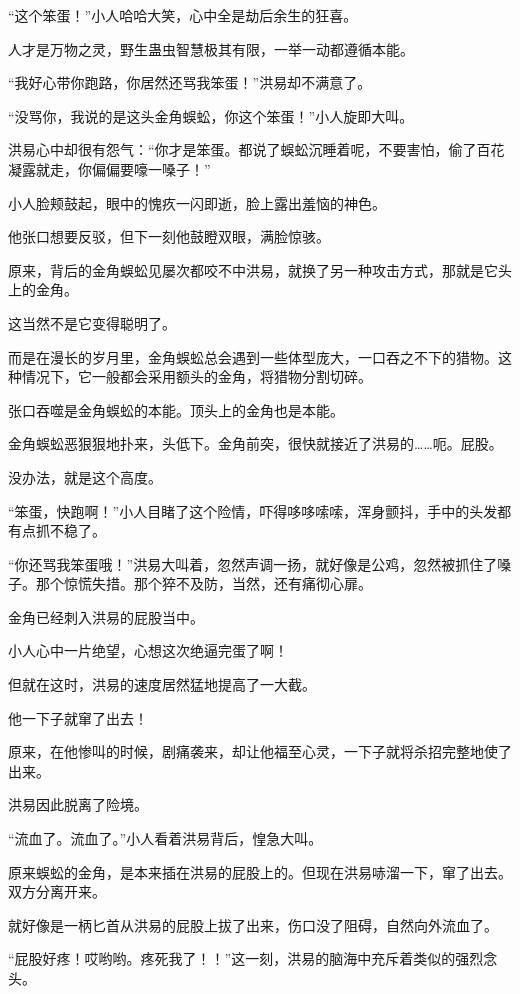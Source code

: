\begin{this_body}
“这个笨蛋！”小人哈哈大笑，心中全是劫后余生的狂喜。

人才是万物之灵，野生蛊虫智慧极其有限，一举一动都遵循本能。

“我好心带你跑路，你居然还骂我笨蛋！”洪易却不满意了。

“没骂你，我说的是这头金角蜈蚣，你这个笨蛋！”小人旋即大叫。

洪易心中却很有怨气：“你才是笨蛋。都说了蜈蚣沉睡着呢，不要害怕，偷了百花凝露就走，你偏偏要嚎一嗓子！”

小人脸颊鼓起，眼中的愧疚一闪即逝，脸上露出羞恼的神色。

他张口想要反驳，但下一刻他鼓瞪双眼，满脸惊骇。

原来，背后的金角蜈蚣见屡次都咬不中洪易，就换了另一种攻击方式，那就是它头上的金角。

这当然不是它变得聪明了。

而是在漫长的岁月里，金角蜈蚣总会遇到一些体型庞大，一口吞之不下的猎物。这种情况下，它一般都会采用额头的金角，将猎物分割切碎。

张口吞噬是金角蜈蚣的本能。顶头上的金角也是本能。

金角蜈蚣恶狠狠地扑来，头低下。金角前突，很快就接近了洪易的……呃。屁股。

没办法，就是这个高度。

“笨蛋，快跑啊！”小人目睹了这个险情，吓得哆哆嗦嗦，浑身颤抖，手中的头发都有点抓不稳了。

“你还骂我笨蛋哦！”洪易大叫着，忽然声调一扬，就好像是公鸡，忽然被抓住了嗓子。那个惊慌失措。那个猝不及防，当然，还有痛彻心扉。

金角已经刺入洪易的屁股当中。

小人心中一片绝望，心想这次绝逼完蛋了啊！

但就在这时，洪易的速度居然猛地提高了一大截。

他一下子就窜了出去！

原来，在他惨叫的时候，剧痛袭来，却让他福至心灵，一下子就将杀招完整地使了出来。

洪易因此脱离了险境。

“流血了。流血了。”小人看着洪易背后，惶急大叫。

原来蜈蚣的金角，是本来插在洪易的屁股上的。但现在洪易哧溜一下，窜了出去。双方分离开来。

就好像是一柄匕首从洪易的屁股上拔了出来，伤口没了阻碍，自然向外流血了。

“屁股好疼！哎哟哟。疼死我了！！”这一刻，洪易的脑海中充斥着类似的强烈念头。


\end{this_body}
